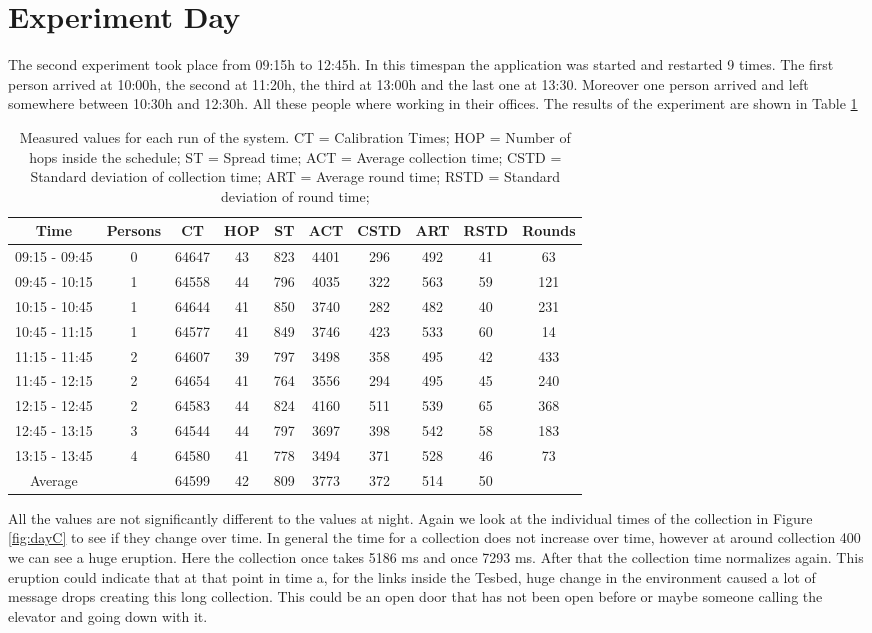 \section{Experiment Day}
The second experiment took place from 09:15h to 12:45h. In this timespan the application was started and restarted 9 times. The first person arrived at 10:00h, the second at 11:20h, the third at 13:00h and the last one at 13:30. Moreover one person arrived and left somewhere between 10:30h and 12:30h. All these people where working in their offices.
The results of the experiment are shown in Table \ref{tab:DayTable}
\begin{table}[htbp]
 \caption{Measured values for each run of the system. CT = Calibration Times; HOP = Number of hops inside the schedule; ST = Spread time; ACT = Average collection time; CSTD = Standard deviation of collection time; ART = Average round time; RSTD = Standard deviation of round time;}
 \centering
 \begin{tabular}{c|c||c|c|c|c|c|c|c|c}
  Time & Persons & CT & HOP & ST & ACT & CSTD & ART & RSTD & Rounds\\ \toprule
  09:15 - 09:45 & 0 & 64647 & 43 & 823 & 4401 & 296 & 492 & 41 & 63\\ 
  09:45 - 10:15 & 1 & 64558 & 44 & 796 & 4035 & 322 & 563 & 59 & 121\\
  10:15 - 10:45 & 1 & 64644 & 41 & 850 & 3740 & 282 & 482 & 40 & 231\\
  10:45 - 11:15 & 1 & 64577 & 41 & 849 & 3746 & 423 & 533 & 60 & 14\\ 
  11:15 - 11:45 & 2 & 64607 & 39 & 797 & 3498 & 358 & 495 & 42 & 433\\
  11:45 - 12:15 & 2 & 64654 & 41 & 764 & 3556 & 294 & 495 & 45 & 240\\
  12:15 - 12:45 & 2 & 64583 & 44 & 824 & 4160 & 511 & 539 & 65 & 368\\
  12:45 - 13:15 & 3 & 64544 & 44 & 797 & 3697 & 398 & 542 & 58 & 183\\
  13:15 - 13:45 & 4 & 64580 & 41 & 778 & 3494 & 371 & 528 & 46 & 73\\ \toprule
  Average & & 64599 & 42 & 809 & 3773 & 372 & 514 & 50 & \\
 \end{tabular}
 \label{tab:DayTable}
\end{table}

All the values are not significantly different to the values at night. Again we look at the individual times of the collection in Figure \ref{fig:dayC} to see if they change over time. In general the time for a collection does not increase over time, however at around collection 400 we can see a huge eruption. Here the collection once takes 5186 ms and once 7293 ms. After that the collection time normalizes again. This eruption could indicate that at that point in time a, for the links inside the Tesbed, huge change in the environment caused a lot of message drops creating this long collection. This could be an open door that has not been open before or maybe someone calling the elevator and going down with it. 



